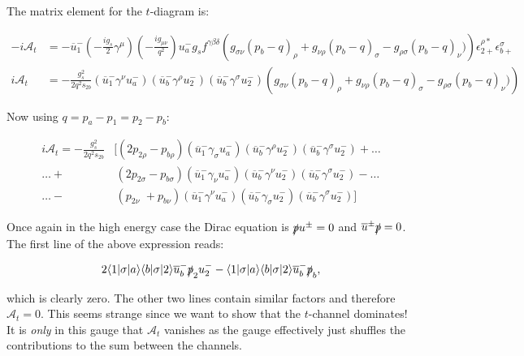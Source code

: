 		The matrix element for the $t$-diagram is:

			\begin{equation}
			\begin{split}
			-i\mathcal{A}_t &=-\overline{u}^-_1\left(-\frac{ig_s}{2}\gamma^\mu\right)\left(-\frac{ig_{\mu\nu}}{q^2}\right)u^-_ag_sf^{\gamma\beta\delta}
			\left(g_{\sigma\nu}(p_b-q)_\rho + g_{\nu\rho}(p_b-q)_\sigma - g_{\rho\sigma}(p_b-q)_\nu)\right)\epsilon^{\rho *}_{2+}\epsilon^{\sigma}_{b+}\\
			i\mathcal{A}_t &=-\frac{g_s^2}{2q^2s_{2b}}\left(\overline{u}^-_1\gamma^{\nu}u^-_a\right)\left(\overline{u}^-_b\gamma^{\rho}u^-_2\right)
			\left(\overline{u}^-_b\gamma^{\sigma}u^-_2\right)\left(g_{\sigma\nu}(p_b-q)_\rho + g_{\nu\rho}(p_b-q)_\sigma - g_{\rho\sigma}(p_b-q)_\nu)\right)
			\end{split}
			\end{equation}

			Now using $q=p_a-p_1=p_2-p_b$:

			\begin{align*}
			i\mathcal{A}_t = -\frac{g_s^2}{2q^2s_{2b}}&[(2p_{2\rho}-p_{b\rho})\left(\overline{u}^-_1\gamma_{\sigma}u^-_a\right)\left(\overline{u}^-_b\gamma^{\rho}u^-_2\right)\left(\overline{u}^-_b\gamma^{\sigma}u^-_2\right)+\ldots \\
			\ldots +&\hspace{2pt} (2p_{2\sigma}-p_{b\sigma})\left(\overline{u}^-_1\gamma_{\nu}u^-_a\right)\left(\overline{u}^-_b\gamma^{\nu}u^-_2\right)\left(\overline{u}^-_b\gamma^{\sigma}u^-_2\right)-\ldots \\
			\ldots -&\hspace{2pt} (p_{2\nu}\hspace{4pt}+p_{b\nu})\left(\overline{u}^-_1\gamma^{\nu}u^-_a\right)\left(\overline{u}^-_b\gamma_{\sigma}u^-_2\right)\left(\overline{u}^-_b\gamma^{\sigma}u^-_2\right)]
			\end{align*}

			Once again in the high energy case the Dirac equation is $\slashed pu^\pm=0$ and $\overline{u}^\pm\slashed p=0$.  The first line of the above expression reads:

			\begin{equation}
			2\langle1|\sigma|a\rangle\langle b|\sigma|2\rangle\overline{u}^-_b\slashed p_2u^-_2 - \langle1|\sigma|a\rangle\langle b|\sigma|2\rangle\overline{u}^-_b\slashed p_b,
			\end{equation}

			which is clearly zero.  The other two lines contain similar factors and therefore $\mathcal{A}_t=0$.
			This seems strange since we want to show that the $t$-channel dominates!  It is \emph{only} in this
			gauge that $\mathcal{A}_t$ vanishes as the gauge effectively just shuffles the contributions to the
			sum between the channels.


